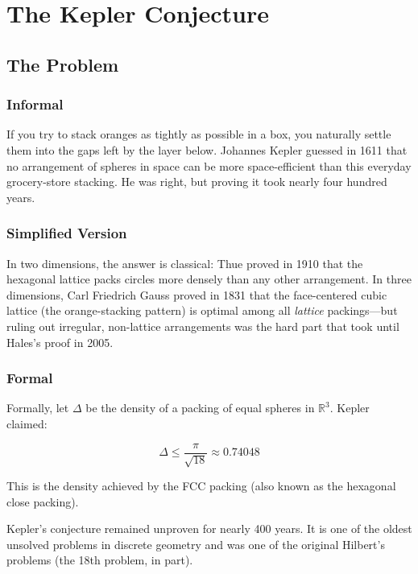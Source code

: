 \let\LocalMacro\relax

\chapter{The Kepler Conjecture}

\section{The Problem}

\subsection{Informal}
If you try to stack oranges as tightly as possible in a box, you naturally settle them into the gaps left by the layer below. Johannes Kepler guessed in 1611 that no arrangement of spheres in space can be more space-efficient than this everyday grocery-store stacking. He was right, but proving it took nearly four hundred years.

\subsection{Simplified Version}
In two dimensions, the answer is classical: Thue proved in 1910 that the hexagonal lattice packs circles more densely than any other arrangement. In three dimensions, Carl Friedrich Gauss proved in 1831 that the face-centered cubic lattice (the orange-stacking pattern) is optimal among all \emph{lattice} packings---but ruling out irregular, non-lattice arrangements was the hard part that took until Hales's proof in 2005.

\subsection{Formal}
Formally, let $\Delta$ be the density of a packing of equal spheres in $\mathbb{R}^3$. Kepler claimed:

\begin{equation}
\Delta \leq \frac{\pi}{\sqrt{18}} \approx 0.74048
\end{equation}

This is the density achieved by the FCC packing (also known as the hexagonal close packing).

\begin{historicalbox}
Kepler's conjecture remained unproven for nearly 400 years. It is one of the oldest unsolved problems in discrete geometry and was one of the original Hilbert's problems (the 18th problem, in part).
\end{historicalbox}

